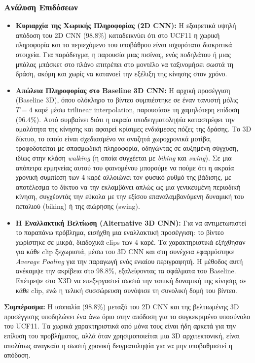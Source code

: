 \documentclass[12pt]{article}
\begin{document}
\subsubsection*{Ανάλυση Επιδόσεων}

\begin{itemize}
    \item \textbf{Κυριαρχία της Χωρικής Πληροφορίας (2D CNN):} Η εξαιρετικά υψηλή απόδοση του 2D CNN (98.8\%) καταδεικνύει ότι στο UCF11 η χωρική πληροφορία και το περιεχόμενο του υποβάθρου είναι ισχυρότατα διακριτικά στοιχεία. Για παράδειγμα, η παρουσία μιας πισίνας, ενός ποδηλάτου ή μιας μπάλας μπάσκετ στο πλάνο επιτρέπει στο μοντέλο να ταξινομήσει σωστά τη δράση, ακόμη και χωρίς να κατανοεί την εξέλιξη της κίνησης στον χρόνο.
    
    \item \textbf{Απώλεια Πληροφορίας στο Baseline 3D CNN:} Η αρχική προσέγγιση (Baseline 3D), όπου ολόκληρο το βίντεο συμπιέστηκε σε έναν τανυστή μόλις $T=4$ καρέ μέσω trilinear interpolation, παρουσίασε τη χαμηλότερη επίδοση (96.4\%). Αυτό συμβαίνει διότι η ακραία υποδειγματοληψία καταστρέφει την ομαλότητα της κίνησης και αφαιρεί κρίσιμες ενδιάμεσες πόζες της δράσης. Το 3D δίκτυο, το οποίο είναι σχεδιασμένο να αναζητά χωροχρονικά μοτίβα, τροφοδοτείται με σπασμωδική πληροφορία, οδηγώντας σε αυξημένη σύγχυση, ιδίως στην κλάση \textit{walking} (η οποία συγχέεται με \textit{biking} και \textit{swing}). Σε μια απόπειρα ερμηνείας αυτού του φαινομένου μπορούμε να πούμε ότι η ακραία χρονική συμπίεση των 4 καρέ αλλοιώνει τον φυσικό ρυθμό της βάδισης, με αποτέλεσμα το δίκτυο να την εκλαμβάνει απλώς ως μια γενικευμένη περιοδική κίνηση, συγχέοντάς την εύκολα με την εξίσου επαναλαμβανόμενη δυναμική του πεταλιού (biking) ή της αιώρησης (swing).
    
    \item \textbf{Η Εναλλακτική Βελτίωση (Alternative 3D CNN):} Για να αντιμετωπιστεί το παραπάνω πρόβλημα, εισήχθη μια εναλλακτική προσέγγιση: το βίντεο χωρίστηκε σε μικρά, διαδοχικά clips των 4 καρέ. Τα χαρακτηριστικά εξήχθησαν για κάθε clip ξεχωριστά, μέσω του 3D CNN και στη συνέχεια εφαρμόστηκε \textit{Average Pooling} για την παραγωγή ενός ενιαίου περιγραφητή. Η μέθοδος αυτή ανέκαμψε την ακρίβεια στο 98.8\%, εξαλείφοντας τα σφάλματα του Baseline. Επέτρεψε στο X3D να επεξεργαστεί σωστά την τοπική δυναμική της κίνησης σε κάθε clip, ενώ η τελική συσσώρευση συνόψισε τη συνολική δομή του βίντεο.
\end{itemize}

\textbf{Συμπέρασμα:} Η ισοπαλία (98.8\%) μεταξύ του 2D CNN και της βελτιωμένης 3D προσέγγισης υποδηλώνει ένα άνω όριο στην απόδοση για το συγκεκριμένο υποσύνολο του UCF11. Τα χωρικά χαρακτηριστικά από μόνα τους είναι ήδη αρκετά για την επίλυση του προβλήματος, αλλά όταν χρησιμοποιείται μια 3D αρχιτεκτονική, είναι απολύτως αναγκαία η σωστή χρονική δειγματοληψία για να μην υποβαθμιστεί η απόδοση.
\end{document}
